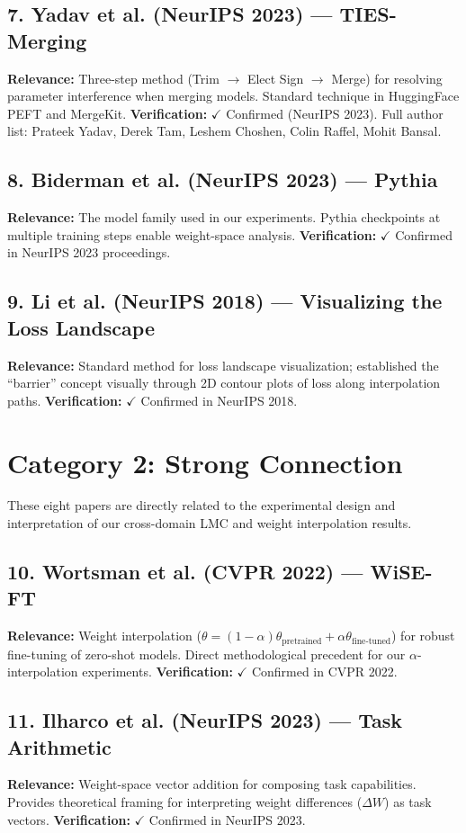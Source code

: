 \documentclass[11pt,a4paper]{article}
\begin{document}
\subsection*{7. Yadav et al. (NeurIPS 2023) --- TIES-Merging}
\textbf{Relevance:} Three-step method (Trim $\rightarrow$ Elect Sign $\rightarrow$ Merge) for resolving parameter interference when merging models. Standard technique in HuggingFace PEFT and MergeKit. \textbf{Verification:} $\checkmark$ Confirmed (NeurIPS 2023). Full author list: Prateek Yadav, Derek Tam, Leshem Choshen, Colin Raffel, Mohit Bansal.

\subsection*{8. Biderman et al. (NeurIPS 2023) --- Pythia}
\textbf{Relevance:} The model family used in our experiments. Pythia checkpoints at multiple training steps enable weight-space analysis. \textbf{Verification:} $\checkmark$ Confirmed in NeurIPS 2023 proceedings.

\subsection*{9. Li et al. (NeurIPS 2018) --- Visualizing the Loss Landscape}
\textbf{Relevance:} Standard method for loss landscape visualization; established the ``barrier'' concept visually through 2D contour plots of loss along interpolation paths. \textbf{Verification:} $\checkmark$ Confirmed in NeurIPS 2018.

\section{Category 2: Strong Connection}

These eight papers are directly related to the experimental design and interpretation of our cross-domain LMC and weight interpolation results.

\subsection*{10. Wortsman et al. (CVPR 2022) --- WiSE-FT}
\textbf{Relevance:} Weight interpolation ($\theta = (1-\alpha)\theta_{\text{pretrained}} + \alpha\theta_{\text{fine-tuned}}$) for robust fine-tuning of zero-shot models. Direct methodological precedent for our $\alpha$-interpolation experiments. \textbf{Verification:} $\checkmark$ Confirmed in CVPR 2022.

\subsection*{11. Ilharco et al. (NeurIPS 2023) --- Task Arithmetic}
\textbf{Relevance:} Weight-space vector addition for composing task capabilities. Provides theoretical framing for interpreting weight differences ($\Delta W$) as task vectors. \textbf{Verification:} $\checkmark$ Confirmed in NeurIPS 2023.
\end{document}
